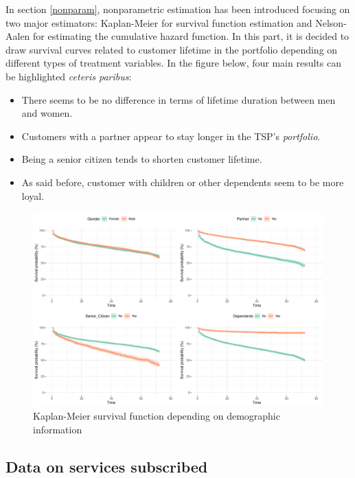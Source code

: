 \documentclass[
]{book}
\providecommand{\tightlist}{%
  \setlength{\itemsep}{0pt}\setlength{\parskip}{0pt}}
\begin{document}
In section \ref{nonparam}, nonparametric estimation has been introduced focusing on two major estimators: Kaplan-Meier for survival function estimation and Nelson-Aalen for estimating the cumulative hazard function. In this part, it is decided to draw survival curves related to customer lifetime in the portfolio depending on different types of treatment variables. In the figure below, four main results can be highlighted \emph{ceteris paribus}:

\begin{itemize}
\tightlist
\item
  There seems to be no difference in terms of lifetime duration between men and women.
\item
  Customers with a partner appear to stay longer in the TSP's \emph{portfolio}.
\item
  Being a senior citizen tends to shorten customer lifetime.
\item
  As said before, customer with children or other dependents seem to be more loyal.
\end{itemize}

\begin{figure}

{\centering \includegraphics[width=50in]{./imgs/demographics_plot} 

}

\caption{Kaplan-Meier survival function depending on demographic information}\label{fig:kmdemographics}
\end{figure}

\hypertarget{data-on-services-subscribed}{%
\subsection*{Data on services subscribed}\label{data-on-services-subscribed}}
\end{document}
